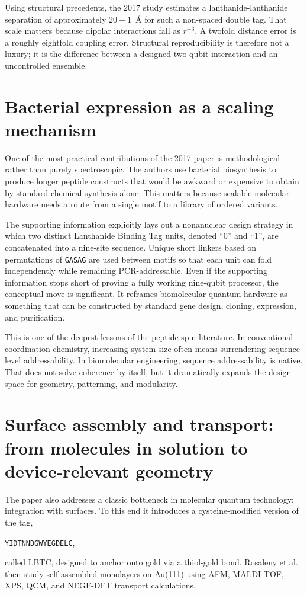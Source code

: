 \documentclass[11pt]{report}
\newcommand{\lbt}{Lanthanide Binding Tag}
\newcommand{\lbtc}{LBTC}
\newcommand{\au}{Au(111)}
\newcommand{\etal}{et al.}
\theoremstyle{definition}
\begin{document}
Using structural precedents, the 2017 study estimates a lanthanide-lanthanide separation of approximately $20 \pm 1$~\AA{} for such a non-spaced double tag. That scale matters because dipolar interactions fall as $r^{-3}$. A twofold distance error is a roughly eightfold coupling error. Structural reproducibility is therefore not a luxury; it is the difference between a designed two-qubit interaction and an uncontrolled ensemble.

\section{Bacterial expression as a scaling mechanism}
One of the most practical contributions of the 2017 paper is methodological rather than purely spectroscopic. The authors use bacterial biosynthesis to produce longer peptide constructs that would be awkward or expensive to obtain by standard chemical synthesis alone. This matters because scalable molecular hardware needs a route from a single motif to a library of ordered variants.

The supporting information explicitly lays out a nonanuclear design strategy in which two distinct \lbt{} units, denoted ``0'' and ``1'', are concatenated into a nine-site sequence. Unique short linkers based on permutations of \texttt{GASAG} are used between motifs so that each unit can fold independently while remaining PCR-addressable. Even if the supporting information stops short of proving a fully working nine-qubit processor, the conceptual move is significant. It reframes biomolecular quantum hardware as something that can be constructed by standard gene design, cloning, expression, and purification.

This is one of the deepest lessons of the peptide-spin literature. In conventional coordination chemistry, increasing system size often means surrendering sequence-level addressability. In biomolecular engineering, sequence addressability is native. That does not solve coherence by itself, but it dramatically expands the design space for geometry, patterning, and modularity.

\section{Surface assembly and transport: from molecules in solution to device-relevant geometry}
The paper also addresses a classic bottleneck in molecular quantum technology: integration with surfaces. To this end it introduces a cysteine-modified version of the tag,
\begin{center}
\texttt{YIDTNNDGWYEGDELC},
\end{center}
called \lbtc{}, designed to anchor onto gold via a thiol-gold bond. Rosaleny \etal{} then study self-assembled monolayers on \au{} using AFM, MALDI-TOF, XPS, QCM, and NEGF-DFT transport calculations.
\end{document}
